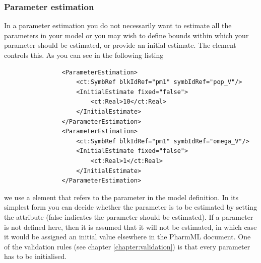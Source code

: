 
\subsubsection{Parameter estimation}


In a parameter estimation you do not necessarily want to estimate all
the parameters in your model or you may wish to define bounds within
which your parameter should be estimated, or provide an initial
estimate.  The  element controls this. As
you can see in the following listing 
\lstset{language=XML}
\begin{lstlisting}
                <ParameterEstimation>
                    <ct:SymbRef blkIdRef="pm1" symbIdRef="pop_V"/>
                    <InitialEstimate fixed="false">
                        <ct:Real>10</ct:Real>
                    </InitialEstimate>
                </ParameterEstimation>
                <ParameterEstimation>
                    <ct:SymbRef blkIdRef="pm1" symbIdRef="omega_V"/>
                    <InitialEstimate fixed="false">
                        <ct:Real>1</ct:Real>
                    </InitialEstimate>
                </ParameterEstimation>
\end{lstlisting}

we use a  element that refers to the parameter in
the model definition.  In its simplest form you can decide whether the
parameter is to be estimated by setting the  attribute
(false indicates the parameter should be estimated). If a parameter is
not defined here, then it is assumed that it will not be estimated, in
which case it would be assigned an initial value elsewhere in the
PharmML document.  One of the validation rules (see chapter
\ref{chapter:validation}) is that every parameter has to be
initialised. 
 

%


